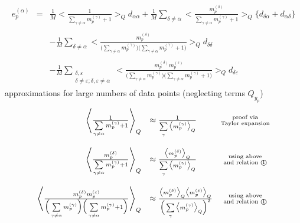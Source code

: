 \begin{equation}
	\begin{array}{lll}
	e_p^{(\alpha)} 
	& = & \frac{1}{M} \Bigg< \frac{1}{\sum\limits_{\gamma \neq \alpha}
		m_p^{(\gamma)} + 1} \Bigg>_Q d_{\alpha\alpha} 
		+ \frac{1}{M} \sum\limits_{\delta \neq \alpha} \Bigg<
			\frac{m_p^{(\delta)}}{\sum\limits_{\gamma \neq \alpha}
				m_p^{(\gamma)} + 1} \Bigg>_Q
		\big\{ d_{\delta\alpha} + d_{\alpha\delta} \big\} \\\\
	&& - \frac{1}{M} \sum\limits_{\delta \neq \alpha} \Bigg<
		\frac{m_p^{(\delta)}}{
		\Big(\sum\limits_{\gamma \neq \alpha} m_p^{(\gamma)} \Big)
		\Big(\sum\limits_{\gamma \neq \alpha} m_p^{(\gamma)} + 1 \Big)}
		\Bigg>_Q d_{\delta\delta} \\\\
	&& - \frac{1}{M} \sum\limits_{\substack{\delta, \varepsilon \\
		\delta \neq \varepsilon; \delta,\varepsilon \neq \alpha}} \Bigg<
		\frac{m_p^{(\delta)} m_p^{(\varepsilon)}}{
		\Big(\sum\limits_{\gamma \neq \alpha} m_p^{(\gamma)} \Big)
		\Big(\sum\limits_{\gamma \neq \alpha} m_p^{(\gamma)} + 1 \Big)}
		\Bigg>_Q d_{\delta\varepsilon}
	\end{array}
\end{equation}
approximations for large numbers of data points (neglecting terms $Q_{y_p}$)
\begin{equation}
	\begin{array}{rlc}
		\Bigg< \frac{1}{\sum\limits_{\gamma \neq \alpha}
			m_p^{(\gamma)} + 1} \Bigg>_Q
		& \approx \frac{1}{\sum\limits_\gamma \big< m_p^{(\gamma)} 
			\big>_Q}
		& \substack{\text{proof via} \\ \text{Taylor expansion}} \\\\
		\Bigg< \frac{m_p^{(\delta)}}{\sum\limits_{\gamma \neq \alpha}
			m_p^{(\gamma)} + 1} \Bigg>_Q
		& \approx \frac{\big< m_p^{(\delta)} \big>_Q}{
			\sum\limits_\gamma \big< m_p^{(\gamma)} \big>_Q}
		& \substack{\text{using above} \\ 
			\text{and relation \textcircled{1}}} \\\\
		\Bigg< \frac{m_p^{(\delta)} m_p^{(\varepsilon)}}{
		\Big(\sum\limits_{\gamma \neq \alpha} m_p^{(\gamma)} \Big)
		\Big(\sum\limits_{\gamma \neq \alpha} m_p^{(\gamma)} + 1 \Big)}
		\Bigg>_Q
		& \approx \frac{ \big< m_p^{(\delta)} \big>_Q 
			\big< m_p^{(\varepsilon)} \big>_Q}{
		\Big(\sum\limits_{\gamma} \big< m_p^{(\gamma)} \big>_Q \Big)^2}
		& \substack{\text{using above} \\ 
			\text{and relation \textcircled{1}}}
	\end{array}
\end{equation}
